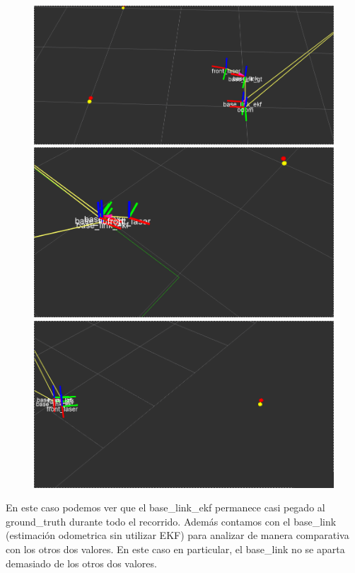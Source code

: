 \begin{figure}[!htb]
  \includegraphics[width=\linewidth]{imagenesEKF/k0.4/1.png}
\endminipage\hfill
{}
  \includegraphics[width=\linewidth]{imagenesEKF/k0.4/2.png}
\endminipage\hfill
{}%
  \includegraphics[width=\linewidth]{imagenesEKF/k0.4/3.png}
\endminipage
\end{figure}

En este caso podemos ver que el base\_link\_ekf permanece casi pegado al ground\_truth durante todo el recorrido. Además contamos con el base\_link (estimación odometrica sin utilizar EKF) para analizar de manera comparativa con los otros dos valores. En este caso en particular, el base\_link no se aparta demasiado de los otros dos valores.

